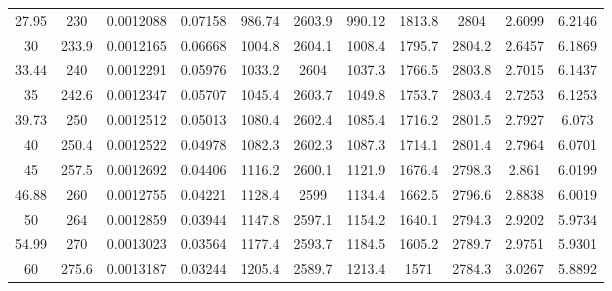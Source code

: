 \begin{longtable}{ccccccccccc}
27.95    & 230         & 0.0012088              & 0.07158             & 986.74                 & 2603.9              & 990.12          & 1813.8       & 2804         & 2.6099         & 6.2146      \\
30       & 233.9       & 0.0012165              & 0.06668             & 1004.8                 & 2604.1              & 1008.4          & 1795.7       & 2804.2       & 2.6457         & 6.1869      \\
33.44    & 240         & 0.0012291              & 0.05976             & 1033.2                 & 2604                & 1037.3          & 1766.5       & 2803.8       & 2.7015         & 6.1437      \\
35       & 242.6       & 0.0012347              & 0.05707             & 1045.4                 & 2603.7              & 1049.8          & 1753.7       & 2803.4       & 2.7253         & 6.1253      \\
39.73    & 250         & 0.0012512              & 0.05013             & 1080.4                 & 2602.4              & 1085.4          & 1716.2       & 2801.5       & 2.7927         & 6.073       \\
40       & 250.4       & 0.0012522              & 0.04978             & 1082.3                 & 2602.3              & 1087.3          & 1714.1       & 2801.4       & 2.7964         & 6.0701      \\
45       & 257.5       & 0.0012692              & 0.04406             & 1116.2                 & 2600.1              & 1121.9          & 1676.4       & 2798.3       & 2.861          & 6.0199      \\
46.88    & 260         & 0.0012755              & 0.04221             & 1128.4                 & 2599                & 1134.4          & 1662.5       & 2796.6       & 2.8838         & 6.0019      \\
50       & 264         & 0.0012859              & 0.03944             & 1147.8                 & 2597.1              & 1154.2          & 1640.1       & 2794.3       & 2.9202         & 5.9734      \\
54.99    & 270         & 0.0013023              & 0.03564             & 1177.4                 & 2593.7              & 1184.5          & 1605.2       & 2789.7       & 2.9751         & 5.9301      \\
60       & 275.6       & 0.0013187              & 0.03244             & 1205.4                 & 2589.7              & 1213.4          & 1571         & 2784.3       & 3.0267         & 5.8892      \\

\end{longtable}
